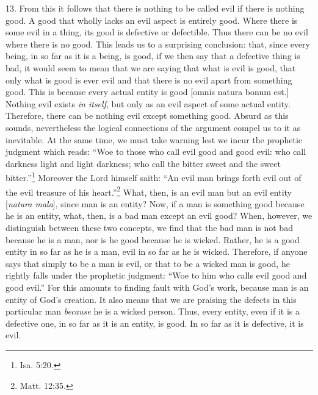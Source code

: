 13. From this it follows that there is nothing to be called evil if there is nothing good. A good that wholly lacks an evil aspect is entirely good. Where there is some evil in a thing, its good is defective or defectible. Thus there can be no evil where there is no good. This leads us to a surprising conclusion: that, since every being, in so far as it is a being, is good, if we then say that a defective thing is bad, it would seem to mean that we are saying that what is evil is good, that only what is good is ever evil and that there is no evil apart from something good. This is because every actual entity is good [omnis natura bonum est.] Nothing evil exists \emph{in itself}, but only as an evil aspect of some actual entity. Therefore, there can be nothing evil except something good. Absurd as this sounds, nevertheless the logical connections of the argument compel us to it as inevitable. At the same time, we must take warning lest we incur the prophetic judgment which reads: ``Woe to those who call evil good and good evil: who call darkness light and light darkness; who call the bitter sweet and the sweet bitter.''\footnote{Isa. 5:20.} Moreover the Lord himself saith: ``An evil man brings forth evil out of the evil treasure of his heart.''\footnote{Matt. 12:35.} What, then, is an evil man but an evil entity [\emph{natura mala}], since man is an entity? Now, if a man is something good because he is an entity, what, then, is a bad man except an evil good? When, however, we distinguish between these two concepts, we find that the bad man is not bad because he is a man, nor is he good because he is wicked. Rather, he is a good entity in so far as he is a man, evil in so far as he is wicked. Therefore, if anyone says that simply to be a man is evil, or that to be a wicked man is good, he rightly falls under the prophetic judgment: ``Woe to him who calls evil good and good evil.'' For this amounts to finding fault with God's work, because man is an entity of God's creation. It also means that we are praising the defects in this particular man \emph{because} he is a wicked person. Thus, every entity, even if it is a defective one, in so far as it is an entity, is good. In so far as it is defective, it is evil.

